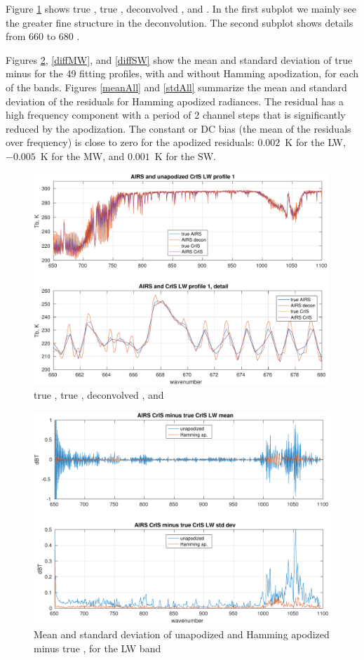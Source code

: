 \documentclass[12pt]{article}
\begin{document}
Figure \ref{specLW} shows true {\cris}, true {\airs}, deconvolved
{\airs}, and {\airs} {\cris}.  In the first subplot we mainly see
the greater fine structure in the deconvolution.  The second subplot
shows details from 660 to 680 {\wn}.  

Figures \ref{diffLW}, \ref{diffMW}, and \ref{diffSW} show the mean
and standard deviation of true {\cris} minus {\airs} {\cris} for the
49 fitting profiles, with and without Hamming apodization, for each
of the {\cris} bands.  Figures \ref{meanAll} and \ref{stdAll}
summarize the mean and standard deviation of the residuals for
Hamming apodized radiances.  The residual has a high frequency
component with a period of 2 channel steps that is significantly
reduced by the apodization.  The constant or DC bias (the mean of
the residuals over frequency) is close to zero for the apodized
residuals: $0.002$~K for the LW, $-0.005$~K for the MW, and
$0.001$~K for the SW.

\begin{figure} %
  \centering
  \includegraphics[height=8cm]{figures/a2cris_spec_LW.pdf}
  \caption{true {\cris}, true {\airs}, deconvolved {\airs}, and
    {\airs} {\cris}}
  \label{specLW}
\end{figure}

\begin{figure} %
  \centering
  \includegraphics[height=8cm]{figures/a2cris_diff_LW.pdf}
  \caption{Mean and standard deviation of unapodized and Hamming
    apodized {\airs} {\cris} minus true {\cris}, for the {\cris} LW
    band}
  \label{diffLW}
\end{figure}
\end{document}
